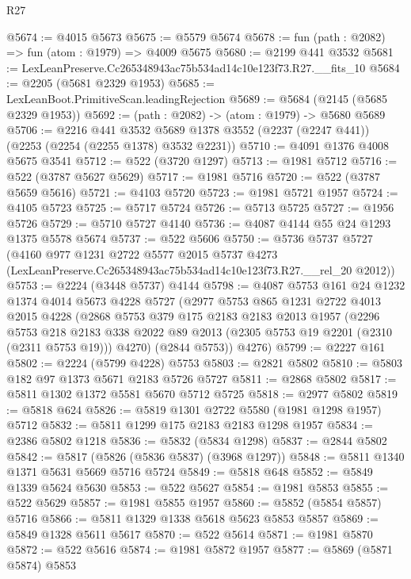 \begin{lexlean}{R27}
\begin{coremodule}
@5674 := @4015 @5673
@5675 := @5579 @5674
@5678 := fun (path : @2082) => fun (atom : @1979) => @4009 @5675
@5680 := @2199 @441 @3532
@5681 := LexLeanPreserve.Cc265348943ac75b534ad14c10e123f73.R27.__fits_10
@5684 := @2205 (@5681 @2329 @1953)
@5685 := LexLeanBoot.PrimitiveScan.leadingRejection
@5689 := @5684 (@2145 (@5685 @2329 @1953))
@5692 := (path : @2082) -> (atom : @1979) -> @5680 @5689
@5706 := @2216
    @441
    @3532
    @5689
    @1378
    @3552
    (@2237 (@2247 @441))
    (@2253 (@2254 (@2255 @1378) @3532 @2231))
@5710 := @4091 @1376 @4008 @5675 @3541
@5712 := @522 (@3720 @1297)
@5713 := @1981 @5712
@5716 := @522 (@3787 @5627 @5629)
@5717 := @1981 @5716
@5720 := @522 (@3787 @5659 @5616)
@5721 := @4103 @5720
@5723 := @1981 @5721 @1957
@5724 := @4105 @5723
@5725 := @5717 @5724
@5726 := @5713 @5725
@5727 := @1956 @5726
@5729 := @5710 @5727 @4140
@5736 := @4087 @4144 @55 @24 @1293 @1375 @5578 @5674
@5737 := @522 @5606
@5750 := @5736
    @5737
    @5727
    (@4160
      @977
      @1231
      @2722
      @5577
      @2015
      @5737
      @4273
      (LexLeanPreserve.Cc265348943ac75b534ad14c10e123f73.R27.__rel_20 @2012))
@5753 := @2224 (@3448 @5737) @4144
@5798 := @4087
    @5753
    @161
    @24
    @1232
    @1374
    @4014
    @5673
    @4228
    @5727
    (@2977
      @5753
      @865
      @1231
      @2722
      @4013
      @2015
      @4228
      (@2868
        @5753
        @379
        @175
        @2183
        @2183
        @2013
        @1957
        (@2296
          @5753
          @218
          @2183
          @338
          @2022
          @89
          @2013
          (@2305 @5753 @19 @2201 (@2310 (@2311 @5753 @19)))
          @4270)
        (@2844 @5753))
      @4276)
@5799 := @2227 @161
@5802 := @2224 (@5799 @4228) @5753
@5803 := @2821 @5802
@5810 := @5803 @182 @97 @1373 @5671 @2183 @5726 @5727
@5811 := @2868 @5802
@5817 := @5811 @1302 @1372 @5581 @5670 @5712 @5725
@5818 := @2977 @5802
@5819 := @5818 @624
@5826 := @5819 @1301 @2722 @5580 (@1981 @1298 @1957) @5712
@5832 := @5811 @1299 @175 @2183 @2183 @1298 @1957
@5834 := @2386 @5802 @1218
@5836 := @5832 (@5834 @1298)
@5837 := @2844 @5802
@5842 := @5817 (@5826 (@5836 @5837) (@3968 @1297))
@5848 := @5811 @1340 @1371 @5631 @5669 @5716 @5724
@5849 := @5818 @648
@5852 := @5849 @1339 @5624 @5630
@5853 := @522 @5627
@5854 := @1981 @5853
@5855 := @522 @5629
@5857 := @1981 @5855 @1957
@5860 := @5852 (@5854 @5857) @5716
@5866 := @5811 @1329 @1338 @5618 @5623 @5853 @5857
@5869 := @5849 @1328 @5611 @5617
@5870 := @522 @5614
@5871 := @1981 @5870
@5872 := @522 @5616
@5874 := @1981 @5872 @1957
@5877 := @5869 (@5871 @5874) @5853

\end{coremodule}
\end{lexlean}
